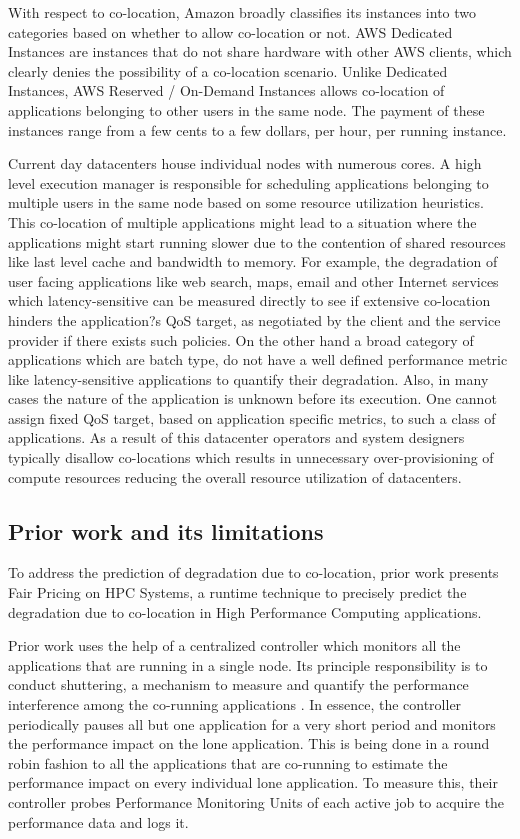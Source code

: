 \documentclass[pageno]{jpaper}
\begin{document}
With respect to co-location, Amazon broadly classifies its instances into two categories based on whether to allow co-location or not. AWS Dedicated Instances are instances that do not share hardware with other AWS clients, which clearly denies the possibility of a co-location scenario. Unlike Dedicated Instances, AWS Reserved / On-Demand Instances allows co-location of applications belonging to other users in the same node. The payment of these instances range from a few cents to a few dollars, per hour, per running instance.

Current day datacenters house individual nodes with numerous cores. A high level execution manager is responsible for scheduling applications belonging to multiple users in the same node based on some resource utilization heuristics. This co-location of multiple applications might lead to a situation where the applications might start running slower due to the contention of shared resources like last level cache and bandwidth to memory. For example, the degradation of user facing applications like web search, maps, email and other Internet services which latency-sensitive can be measured directly to see if extensive co-location hinders the application?s QoS target, as negotiated by the client and the service provider if there exists such policies. On the other hand a broad category of applications which are batch type, do not have a well defined performance metric like latency-sensitive applications to quantify their degradation. Also, in many cases the nature of the application is unknown before its execution. One cannot assign fixed QoS target, based on application specific metrics, to such a class of applications. As a result of this datacenter operators and system designers typically disallow co-locations which results in unnecessary over-provisioning of compute resources reducing the overall resource utilization of datacenters.
\subsection{Prior work and its limitations}
\label{subsec:Priorworkanditslimitations}

To address the prediction of degradation due to co-location, prior work presents Fair Pricing on HPC Systems, a runtime technique to precisely predict the degradation due to co-location in High Performance Computing applications.

Prior work uses the help of a centralized controller which monitors all the applications that are running in a single node. Its principle responsibility is to conduct shuttering, a mechanism to measure and quantify the performance interference among the co-running applications \cite{fairpricing} \cite{Gupta_QualityTime_ISPASS_2014}. In essence, the controller periodically pauses all but one application for a very short period and monitors the performance impact on the lone application. This is being done in a round robin fashion to all the applications that are co-running to estimate the performance impact on every individual lone application. To measure this, their controller probes Performance Monitoring Units of each active job to acquire the performance data and logs it.
\end{document}
